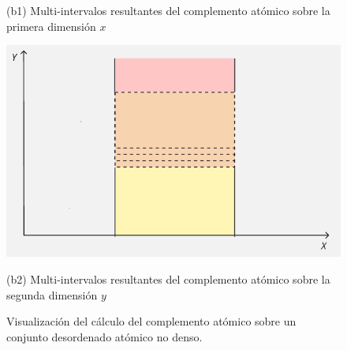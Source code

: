 \begin{figure}[H]
\begin{minipage}{0.41\textwidth}
        \caption*{     \centering (b1) Multi-intervalos resultantes del complemento atómico sobre la primera dimensión $x$}
    \end{minipage}
    \begin{minipage}{0.41\textwidth}
        \centering
        \includegraphics[width=\textwidth]{figures/Conceptos previos/Conjuntos/compAtom3.png}
        \caption*{    \centering (b2) Multi-intervalos resultantes del complemento atómico sobre la segunda dimensión $y$}
    \end{minipage}
    
    \caption{Visualización del cálculo del complemento atómico sobre un conjunto desordenado atómico no denso.}
    \label{fig:complemento}
\end{figure}

